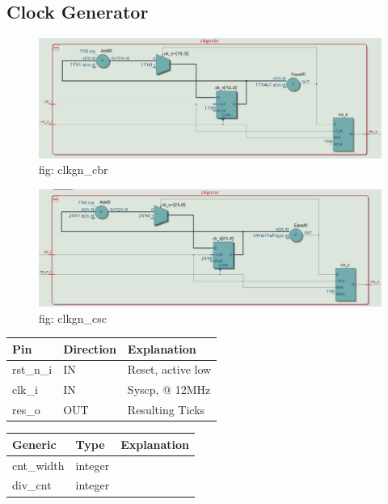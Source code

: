 \documentclass[12pt,a4 paper] {report}
\begin{document}
\subsection{Clock Generator}
\begin{figure}[h]
	\centering	
	\includegraphics[scale=0.2]{../png/clkgn_cbr.png}
	\newline
	fig: clkgn\_cbr\\
\end{figure}
\begin{figure}[h]
	\centering	
	\includegraphics[scale=0.2]{../png/clkgn_csc.png}
	\newline
	fig: clkgn\_csc\\
\end{figure}
\begin{center}
	\begin{tabular}{| p{2cm} | p{2cm} | p{4cm} |}
		\hline
		Pin & Direction  & Explanation\\
		\hline	
  		rst\_n\_i & IN & Reset, active low\\
  		\hline
		clk\_i   &IN & Syscp, @ 12MHz\\
		\hline
		res\_o   & OUT &Resulting Ticks\\
		\hline
		
	\end{tabular}
\end{center}
\begin{center}
	\begin{tabular}{| p{2cm} | p{2cm} | p{4cm} |}
	\hline
	Generic & Type & Explanation \\
	\hline
	cnt\_width & integer & \\
	\hline
	div\_cnt & integer & \\	
	\hline
	\end{tabular}	
\end{center}
\end{document}
